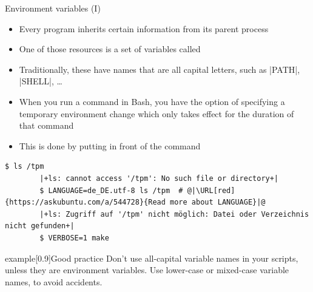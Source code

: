 \begin{frame}[fragile]{Environment variables (I)}
    \vspace{-3mm}
    \begin{itemize}
        \item Every program inherits certain information from its parent process 
        \item One of those resources is a set of variables called 
        \item Traditionally, these have names that are all capital letters, such as \bash|PATH|, \bash|SHELL|, \ldots
        \item When you run a command in Bash, you have the option of specifying a temporary environment change which only takes effect for the duration of that command
        \item This is done by putting  in front of the command
    \end{itemize}
    \begin{lstlisting}[style=MyBash]
        $ ls /tpm
        |+ls: cannot access '/tpm': No such file or directory+|
        $ LANGUAGE=de_DE.utf-8 ls /tpm  # @|\URL[red]{https://askubuntu.com/a/544728}{Read more about LANGUAGE}|@
        |+ls: Zugriff auf '/tpm' nicht möglich: Datei oder Verzeichnis nicht gefunden+|
        $ VERBOSE=1 make
    \end{lstlisting}
    \begin{varblock}{example}[0.9\textwidth]{Good practice}
        Don't use all-capital variable names in your scripts, unless they are environment variables.
        Use lower-case or mixed-case variable names, to avoid accidents.
    \end{varblock}
    \PrepareURLsymbol[PB]
\end{frame}
